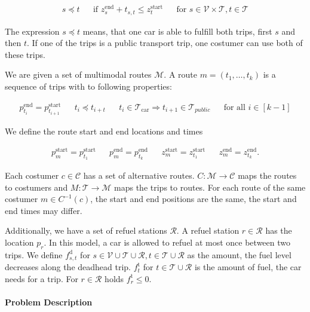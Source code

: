 \begin{align*}
	s\preceq t & & \text{if } z_s^{\operatorname{end}} + t_{s,t} \leq z_t^{\operatorname{start}} & & \text{for } s\in\mathcal{V}\times\mathcal{T}, t\in\mathcal{T}
\end{align*}

The expression $s\preceq t$ means, that one car is able to fulfill both trips, first $s$ and then $t$. If one of the trips is a public transport trip, one costumer can use both of these trips.

We are given a set of multimodal routes $\mathcal{M}$. A route $m=\left(t_1,\dots,t_k\right)$ is a sequence of trips with to following properties:

\begin{align*}
	p_{t_i}^{\operatorname{end}} = p_{t_{i+1}}^{\operatorname{start}} & & t_i\preceq t_{i+t} & & t_i\in\mathcal{T}_{\operatorname{car}}\Rightarrow t_{i+1}\in\mathcal{T}_{public} & & \text{for all } i\in[k-1]
\end{align*}

We define the route start and end locations and times

\begin{align*}
	p_m^{\operatorname{start}} = p_{t_1}^{\operatorname{start}} & & p_m^{\operatorname{end}} = p_{t_k}^{\operatorname{end}} & & z_m^{\operatorname{start}} = z_{t_1}^{\operatorname{start}} & & z_m^{\operatorname{end}} = z_{t_k}^{\operatorname{end}}.
\end{align*}

Each costumer $c\in\mathcal{C}$ has a set of alternative routes. $C:\mathcal{M}\to\mathcal{C}$ maps the routes to costumers and $M:\mathcal{T}\to\mathcal{M}$ maps the trips to routes. For each route of the same costumer $m\in C^{-1}(c)$, the start and end positions are the same, the start and end times may differ.

Additionally, we have a set of refuel stations $\mathcal{R}$. A refuel station $r\in\mathcal{R}$ has the location $p_r$. In this model, a car is allowed to refuel at most once between two trips. We define $f_{s,t}^{\operatorname{d}}$ for $s\in\mathcal{V}\cup\mathcal{T}\cup\mathcal{R},t\in\mathcal{T}\cup\mathcal{R}$ as the amount, the fuel level decreases along the deadhead trip. $f_t^{\operatorname{t}}$ for $t\in\mathcal{T}\cup\mathcal{R}$ is the amount of fuel, the car needs for a trip. For $r\in\mathcal{R}$ holds $f_r^{\operatorname{t}}\leq 0$. 

\paragraph{Problem Description} \parfill

